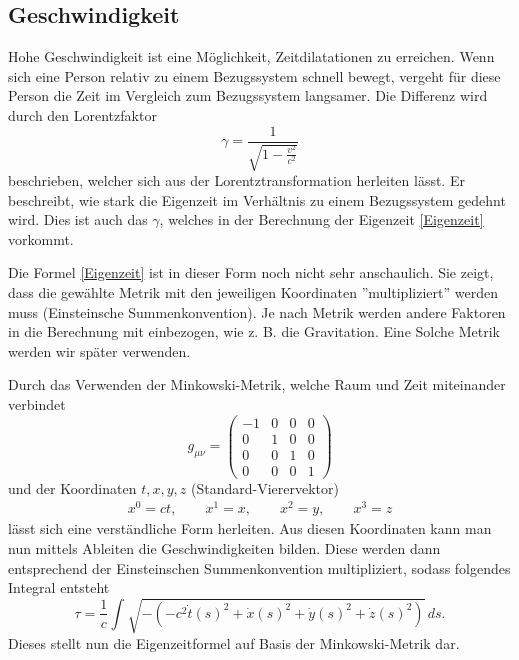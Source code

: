 \begin{refsection}
\subsection{Geschwindigkeit}
Hohe Geschwindigkeit ist eine Möglichkeit, Zeitdilatationen zu erreichen. Wenn sich eine Person relativ zu einem Bezugssystem schnell bewegt, vergeht f\"ur diese Person die Zeit im Vergleich zum Bezugssystem langsamer. Die Differenz wird durch den Lorentzfaktor 
\begin{equation} \label{lorentzfaktor}
\gamma=\frac{1}{\sqrt{1-\displaystyle\frac{v^2}{c^2}}} 
\end{equation}
beschrieben, welcher sich aus der Lorentztransformation herleiten l\"asst.
Er beschreibt, wie stark die Eigenzeit im Verhältnis zu einem Bezugssystem gedehnt wird. 
Dies ist auch das $\gamma$, welches in der Berechnung der Eigenzeit \eqref{Eigenzeit} vorkommt. 

Die Formel \eqref{Eigenzeit} ist in dieser Form noch nicht sehr anschaulich. Sie zeigt, dass die gewählte Metrik mit den jeweiligen Koordinaten ''multipliziert'' werden muss (Einsteinsche Summenkonvention). Je nach Metrik werden andere Faktoren in die Berechnung mit einbezogen, wie z. B. die Gravitation. Eine Solche Metrik werden wir später verwenden.

Durch das Verwenden der Minkowski-Metrik, welche Raum und Zeit miteinander verbindet 
\begin{equation}
    g_{\mu\nu}=
    \begin{pmatrix}
        -1 & 0 & 0 & 0 \\
        0 & 1 & 0 & 0 \\
        0 & 0 & 1 & 0 \\
        0 & 0 & 0 & 1
    \end{pmatrix}
\end{equation}
und der Koordinaten $t, x, y, z$ (Standard-Vierervektor)
\begin{align*}
x^{0}=ct,\qquad x^{1}=x,\qquad x^{2}=y,\qquad x^{3}=z 
\end{align*}
l\"asst sich eine verst\"andliche Form herleiten.
Aus diesen Koordinaten kann man nun mittels Ableiten die Geschwindigkeiten bilden. Diese werden dann entsprechend der Einsteinschen Summenkonvention multipliziert, sodass folgendes Integral entsteht 
\begin{equation}\label{minkowski}
    \tau
    =
    \frac{1}{c}\int_{}^{}\sqrt{-(-c^2\dot{t}(s)^{2}+\dot{x}(s)^{2}+\dot{y}(s)^{2}+\dot{z}(s)^{2})}\,ds.
\end{equation} 
Dieses stellt nun die Eigenzeitformel auf Basis der Minkowski-Metrik dar.


\end{refsection}
